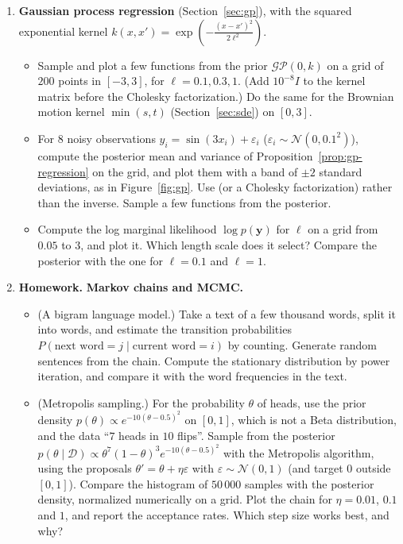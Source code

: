 \documentclass[11pt]{article}
\newcommand{\homework}{\textcolor{red!70!black}{\textbf{Homework.}}}
\newcommand{\py}[1]{\texttt{\detokenize{#1}}}
\theoremstyle{definition}
\theoremstyle{plain}
\theoremstyle{remark}
\begin{document}
\begin{enumerate}[label=\textbf{P\arabic*.}, leftmargin=*]
    \item \textbf{Gaussian process regression} (Section~\ref{sec:gp}), with the squared exponential kernel $k(x, x') = \exp(-\frac{(x - x')^2}{2\ell^2})$.
    \begin{itemize}
        \item Sample and plot a few functions from the prior $\mathcal{GP}(0, k)$ on a grid of $200$ points in $[-3, 3]$, for $\ell = 0.1, 0.3, 1$. (Add $10^{-8}I$ to the kernel matrix before the Cholesky factorization.) Do the same for the Brownian motion kernel $\min(s, t)$ (Section~\ref{sec:sde}) on $[0, 3]$.
        \item For $8$ noisy observations $y_i = \sin(3x_i) + \varepsilon_i$ ($\varepsilon_i \sim \mathcal{N}(0, 0.1^2)$), compute the posterior mean and variance of Proposition~\ref{prop:gp-regression} on the grid, and plot them with a band of $\pm 2$ standard deviations, as in Figure~\ref{fig:gp}. Use \py{np.linalg.solve} (or a Cholesky factorization) rather than the inverse. Sample a few functions from the posterior.
        \item Compute the log marginal likelihood $\log p(\mathbf{y})$ for $\ell$ on a grid from $0.05$ to $3$, and plot it. Which length scale does it select? Compare the posterior with the one for $\ell = 0.1$ and $\ell = 1$.
    \end{itemize}

    \item \homework{} \textbf{Markov chains and MCMC.}
    \begin{itemize}
        \item (A bigram language model.) Take a text of a few thousand words, split it into words, and estimate the transition probabilities $P(\text{next word} = j \mid \text{current word} = i)$ by counting. Generate random sentences from the chain. Compute the stationary distribution by power iteration, and compare it with the word frequencies in the text.
        \item (Metropolis sampling.) For the probability $\theta$ of heads, use the prior density $p(\theta) \propto e^{-10(\theta - 0.5)^2}$ on $[0, 1]$, which is not a Beta distribution, and the data ``$7$ heads in $10$ flips''. Sample from the posterior $p(\theta \mid \mathcal{D}) \propto \theta^7(1 - \theta)^3 e^{-10(\theta - 0.5)^2}$ with the Metropolis algorithm, using the proposals $\theta' = \theta + \eta\varepsilon$ with $\varepsilon \sim \mathcal{N}(0, 1)$ (and target $0$ outside $[0, 1]$). Compare the histogram of $50\,000$ samples with the posterior density, normalized numerically on a grid. Plot the chain for $\eta = 0.01$, $0.1$ and $1$, and report the acceptance rates. Which step size works best, and why?
    \end{itemize}


\end{enumerate}
\end{document}
